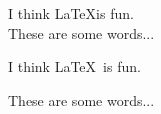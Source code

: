\documentclass{article}
\begin{document}
\noindent I think \LaTeX is fun.\\
These are some words...

\noindent I think \LaTeX\ is fun.

These are some words...
\end{document}
